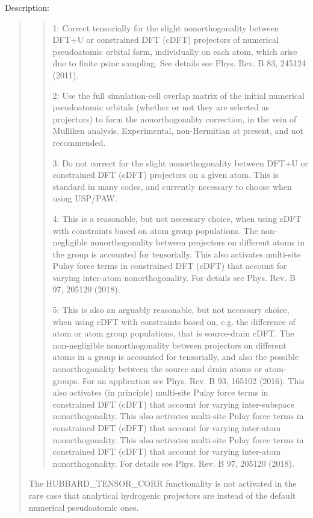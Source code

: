 \documentclass[letterpaper,10pt,english]{sphinxmanual}
\begin{document}
Description:
\begin{quote}
\begin{quote}

1: Correct tensorially for the slight nonorthogonality between DFT+U or constrained DFT (cDFT) projectors of numerical pseudoatomic orbital form, individually on each atom, which arise due to finite psinc sampling. See details see Phys. Rev. B 83, 245124 (2011).

2: Use the full simulation-cell overlap matrix of the initial numerical pseudoatomic orbitals (whether or not they are selected as projectors) to form the nonorthogonality correction, in the vein of Mulliken analysis. Experimental, non-Hermitian at present, and not recommended.

3: Do not correct for the slight nonorthogonality between DFT+U or constrained DFT (cDFT) projectors on a given atom. This is standard in many codes, and currently necessary to choose when using USP/PAW.

4: This is a reasonable, but not necessary choice, when using cDFT with constraints based on atom group populations. The non-negligible nonorthogonality between projectors on different atoms in the group is accounted for tensorially. This also activates multi-site Pulay force terms in constrained DFT (cDFT) that account for varying inter-atom nonorthogonality. For details see Phys. Rev. B 97, 205120 (2018).

5: This is also an arguably reasonable, but not necessary choice, when using cDFT with constraints based on, e.g. the difference of atom or atom group populations, that is source-drain cDFT. The non-negligible nonorthogonality between projectors on different atoms in a group is accounted for tensorially, and also the possible nonorthogonality between the source and drain atoms or atom-groups. For an application see Phys. Rev. B 93, 165102 (2016). This also activates (in principle) multi-site Pulay force terms in constrained DFT (cDFT) that account for varying inter-subspace nonorthogonality. This also activates multi-site Pulay force terms in constrained DFT (cDFT) that account for varying inter-atom nonorthogonality. This also activates multi-site Pulay force terms in constrained DFT (cDFT) that account for varying inter-atom nonorthogonality. For details see Phys. Rev. B 97, 205120 (2018).
\end{quote}

The HUBBARD\_TENSOR\_CORR functionality is not activated in the rare case that analytical hydrogenic projectors are instead of the default numerical pseudoatomic ones.
\end{quote}
\end{document}
